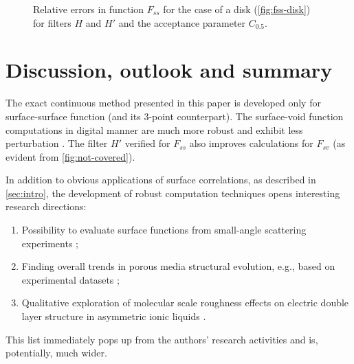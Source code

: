 \documentclass[1p]{elsarticle}
\begin{document}
\begin{figure}[!hpt]
  \centering
  \hfill
  \caption[]{Relative errors in function $F_{ss}$ for the case of a disk
    (\cref{fig:fss-disk}) for filters $H$ and $H'$ and the acceptance parameter
    $C_{0.5}$.}
  \label{fig:error}
\end{figure}

\section{Discussion, outlook and summary}
\label{sec:summary}
The exact continuous method presented in this paper is developed only for
surface-surface function (and its 3-point counterpart). The surface-void
function computations in digital manner are much more robust and exhibit less
perturbation \cite{ma2018SS,Samarin}. The filter $H'$ verified for $F_{ss}$ also
improves calculations for $F_{sv}$ (as evident from \cref{fig:not-covered}).

In addition to obvious applications of surface correlations, as described in
\cref{sec:intro}, the development of robust computation techniques opens
interesting research directions:
\begin{enumerate}
    \item Possibility to evaluate surface functions from small-angle scattering
      experiments \cite{dietrich1995scattering};
    \item Finding overall trends in porous media structural evolution, e.g.,
      based on experimental datasets \cite{noiriel2021pore,fomin2023};
    \item Qualitative exploration of molecular scale roughness effects on electric 
      double layer structure in asymmetric ionic liquids \cite{aslyamov2021,khlyupin2023}.
\end{enumerate}
This list immediately pops up from the authors' research activities and is,
potentially, much wider.
\end{document}
